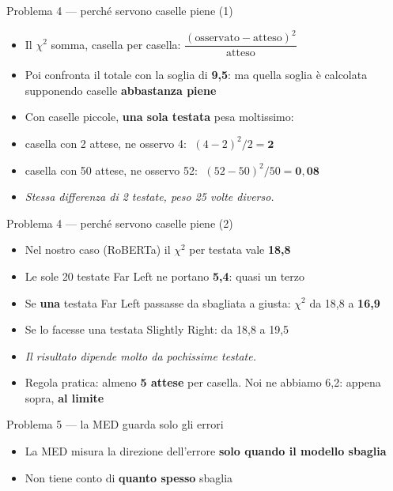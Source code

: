 \documentclass[aspectratio=169]{beamer}
\newcommand{\hl}[1]{\textbf{#1}}
\begin{document}
\begin{frame}{Problema 4 --- perch\'e servono caselle piene (1)}
  \vfill
  \begin{itemize}[<+->]
    \setlength\itemsep{0.8em}
    \item Il $\chi^2$ somma, casella per casella: $\dfrac{(\text{osservato} - \text{atteso})^2}{\text{atteso}}$
    \item Poi confronta il totale con la soglia di \hl{9,5}: ma quella soglia \`e calcolata supponendo caselle \hl{abbastanza piene}
    \item Con caselle piccole, \hl{una sola testata} pesa moltissimo:
    \item[] casella con 2 attese, ne osservo 4: $\;(4-2)^2/2 = \mathbf{2}$
    \item[] casella con 50 attese, ne osservo 52: $\;(52-50)^2/50 = \mathbf{0{,}08}$
    \item[] {\small\itshape Stessa differenza di 2 testate, peso 25 volte diverso.}
  \end{itemize}
  \vfill
\end{frame}

\begin{frame}{Problema 4 --- perch\'e servono caselle piene (2)}
  \vfill
  \begin{itemize}[<+->]
    \setlength\itemsep{0.8em}
    \item Nel nostro caso (RoBERTa) il $\chi^2$ per testata vale \hl{18,8}
    \item Le sole 20 testate Far Left ne portano \hl{5,4}: quasi un terzo
    \item Se \hl{una} testata Far Left passasse da sbagliata a giusta: $\chi^2$ da 18,8 a \hl{16,9}
    \item Se lo facesse una testata Slightly Right: da 18,8 a 19,5
    \item[] {\small\itshape Il risultato dipende molto da pochissime testate.}
    \item Regola pratica: almeno \hl{5 attese} per casella. Noi ne abbiamo 6,2: appena sopra, \hl{al limite}
  \end{itemize}
  \vfill
\end{frame}


\begin{frame}{Problema 5 --- la MED guarda solo gli errori}
  \vfill
  \begin{itemize}[<+->]
    \setlength\itemsep{1.0em}
    \item La MED misura la direzione dell'errore \hl{solo quando il modello sbaglia}
    \item Non tiene conto di \hl{quanto spesso} sbaglia
  \end{itemize}
  \vfill
\end{frame}
\end{document}
